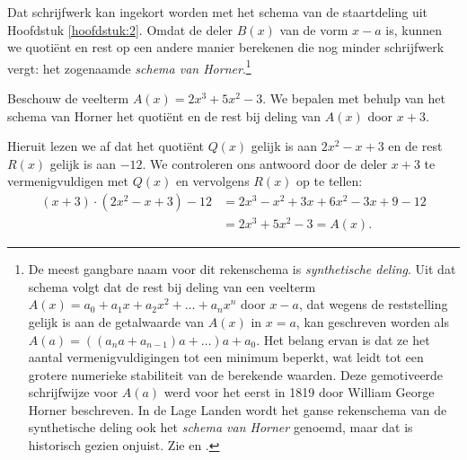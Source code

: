 \documentclass{ximera}
\begin{document}
\begin{algorithm}
Dat schrijfwerk kan ingekort worden met het schema van de staartdeling uit Hoofdstuk \ref{hoofdstuk:2}. Omdat de deler $B(x)$ van de vorm $x-a$ is, kunnen we quotiënt en rest op een andere manier berekenen die nog minder schrijfwerk vergt: het zogenaamde \textit{ schema van Horner}.\footnote{De meest gangbare naam voor dit rekenschema is \textit{ synthetische deling}. Uit dat schema volgt dat de rest bij deling van een veelterm $A(x) = a_0 + a_1x + a_2x^2 + \dots + a_nx^n$ door $x-a$, dat wegens de reststelling gelijk is aan de getalwaarde van $A(x)$ in $x=a$, kan geschreven worden als $A(a) = ((a_n a +a_{n-1})a+\dots)a+a_0$. Het belang ervan is dat ze het aantal vermenigvuldigingen tot een minimum beperkt, wat leidt tot een grotere numerieke stabiliteit van de berekende waarden. Deze gemotiveerde schrijfwijze voor $A(a)$ werd voor het eerst in 1819 door William George Horner beschreven. In de Lage Landen wordt het ganse rekenschema van de synthetische deling ook het \textit{ schema van Horner} genoemd, maar dat is historisch gezien onjuist. Zie \cite{Cajori} en \cite{wiki:Hornerschema}.} 
\renewcommand{\kolbreed}{\widthof{$2 \cdot 30$}}

\end{algorithm} 

\begin{example} 
Beschouw de veelterm $A(x) = 2x^3 + 5x^2 - 3$. We bepalen met behulp van het schema van Horner het quotiënt en de rest bij deling van $A(x)$ door $x+3$. 
\renewcommand{\kolbreed}{\widthof{$-3 \cdot (-1)$}}

Hieruit lezen we af dat het quotiënt $Q(x)$ gelijk is aan $2x^2-x+3$ en de rest $R(x)$ gelijk is aan $-12$. We controleren ons antwoord door de deler $x+3$ te vermenigvuldigen met $Q(x)$ en vervolgens $R(x)$ op te tellen:
\begin{align*}
(x+3)\cdot(2x^2-x+3) - 12 
& = 2x^3 - x^2 + 3x + 6x^2 - 3x + 9 - 12 \\
& = 2x^3 + 5x^2 - 3 = A(x).
\end{align*}
\end{example} 
\end{document}
